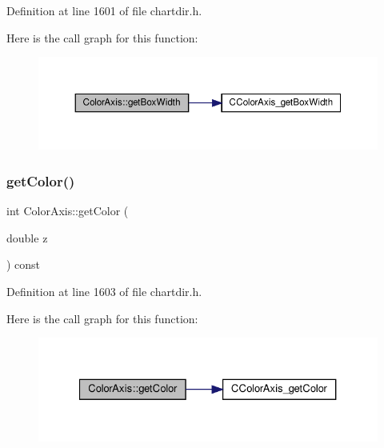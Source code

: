 Definition at line 1601 of file chartdir.\+h.

Here is the call graph for this function\+:
\nopagebreak
\begin{figure}[H]
\begin{center}
\leavevmode
\includegraphics[width=350pt]{class_color_axis_a72496a3139183a40c1eb75d77b63a437_cgraph}
\end{center}
\end{figure}
\mbox{\label{class_color_axis_a8531ba9a751d70e4228ba06f6449433f}} 
\subsubsection{\texorpdfstring{get\+Color()}{getColor()}}
{\footnotesize\ttfamily int Color\+Axis\+::get\+Color (\begin{DoxyParamCaption}\item[{double}]{z }\end{DoxyParamCaption}) const\hspace{0.3cm}{\ttfamily [inline]}}



Definition at line 1603 of file chartdir.\+h.

Here is the call graph for this function\+:
\nopagebreak
\begin{figure}[H]
\begin{center}
\leavevmode
\includegraphics[width=327pt]{class_color_axis_a8531ba9a751d70e4228ba06f6449433f_cgraph}
\end{center}
\end{figure}
\mbox{\label{class_color_axis_a0b1903f8220e8ba4523e887d79cc0f74}} 

